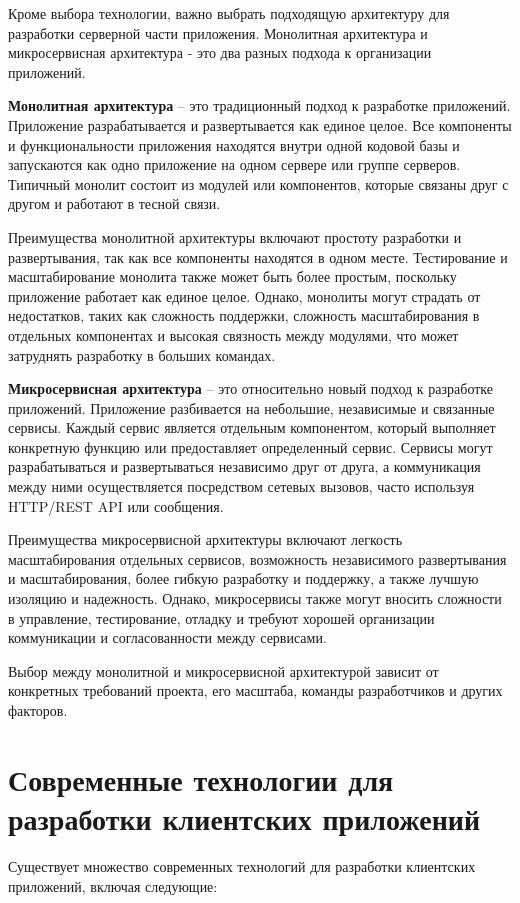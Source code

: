 Кроме выбора технологии, важно выбрать подходящую архитектуру для разработки серверной части приложения.
Монолитная архитектура и микросервисная архитектура - это два разных подхода к организации приложений.

\textbf{Монолитная архитектура} -- это традиционный подход к разработке приложений. 
Приложение разрабатывается и развертывается как единое целое. 
Все компоненты и функциональности приложения находятся внутри одной кодовой базы и запускаются как одно приложение на одном сервере или группе серверов. 
Типичный монолит состоит из модулей или компонентов, которые связаны друг с другом и работают в тесной связи.

Преимущества монолитной архитектуры включают простоту разработки и развертывания, 
так как все компоненты находятся в одном месте. 
Тестирование и масштабирование монолита также может быть более простым, 
поскольку приложение работает как единое целое. Однако, монолиты могут страдать от недостатков, 
таких как сложность поддержки, сложность масштабирования в отдельных компонентах и 
высокая связность между модулями, что может затруднять разработку в больших командах.

\textbf{Микросервисная архитектура} -- это относительно новый подход к разработке приложений. 
Приложение разбивается на небольшие, независимые и связанные сервисы. 
Каждый сервис является отдельным компонентом, который выполняет конкретную функцию или предоставляет определенный сервис. 
Сервисы могут разрабатываться и развертываться независимо друг от друга, 
а коммуникация между ними осуществляется посредством сетевых вызовов, 
часто используя HTTP/REST API или сообщения.

Преимущества микросервисной архитектуры включают легкость масштабирования отдельных сервисов,
возможность независимого развертывания и масштабирования, более гибкую разработку и поддержку,
а также лучшую изоляцию и надежность. Однако, микросервисы также могут вносить сложности в управление,
тестирование, отладку и требуют хорошей организации коммуникации и согласованности между сервисами.

Выбор между монолитной и микросервисной архитектурой зависит от
конкретных требований проекта, его масштаба,
команды разработчиков и других факторов.



\section{Современные технологии для разработки клиентских приложений}
Существует множество современных технологий для разработки клиентских приложений, включая следующие:

